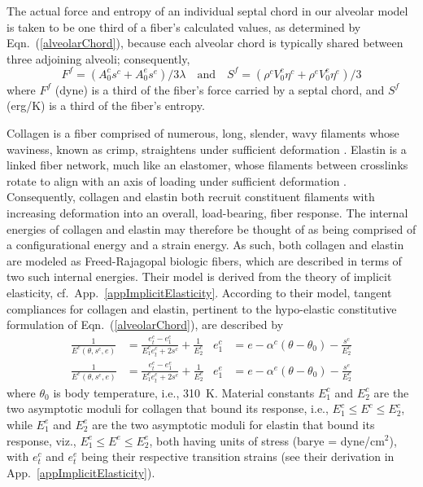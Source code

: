 The actual force and entropy of an individual septal chord in our alveolar model is taken to be one third of a fiber's calculated values, as determined by Eqn.~(\ref{alveolarChord}), because each alveolar chord is typically shared between three adjoining alveoli; consequently, 
\begin{equation}
    \label{septalChordCEs}
    F^f = ( A_0^c s^c + A_0^e s^e ) / 3 \lambda 
    \quad \text{and} \quad
    S^f = ( \rho^c V_0^c \eta^c + \rho^e V_0^e \eta^e ) / 3 
\end{equation}  
where $F^f$ (dyne) is a third of the fiber's force carried by a septal chord, and $S^f$ (erg/K) is a third of the fiber's entropy.

Collagen is a fiber comprised of numerous, long, slender, wavy filaments whose waviness, known as crimp, straightens under sufficient deformation \cite{Kastelicetal'78,FreedDoehring05}.  Elastin is a linked fiber network, much like an elastomer, whose filaments between crosslinks rotate to align with an axis of loading under sufficient deformation \cite{AaronGosline81,Urry89}.  Consequently, collagen and elastin both recruit constituent filaments with increasing deformation into an overall, load-bearing, fiber response.  The internal energies of collagen and elastin may therefore be thought of as being comprised of a configurational energy and a strain energy.  As such, both collagen and elastin are modeled as Freed-Rajagopal biologic fibers, which are described in terms of two such internal energies.  Their model is derived from the theory of implicit elasticity, cf.\ App.~\ref{appImplicitElasticity}.  According to their model, tangent compliances for collagen and elastin, pertinent to the hypo-elastic constitutive formulation of Eqn.~(\ref{alveolarChord}), are described by
\begin{subequations}
    \label{septalChordModuli}
    \begin{align}
	\frac{1}{E^c (\theta , s^c , e )} & = \frac{e_t^c - e_1^c}{E_1^c e_t^c + 2s^c} + \frac{1}{E_2^c} &
	e_1^c & = e - \alpha^c (\theta - \theta_0) - \frac{s^c}{E_2^c} \\
    \frac{1}{E^e (\theta , s^e , e )} & = \frac{e_t^e - e_1^e}{E_1^e e_t^e + 2s^e} + \frac{1}{E_2^e} &
    e_1^e & = e - \alpha^e (\theta - \theta_0) - \frac{s^e}{E_2^e} 
    \end{align}
\end{subequations}
where $\theta_0$ is body temperature, i.e., 310~K.  Material constants $E_1^c$ and $E_2^c$ are the two asymptotic moduli for collagen that bound its response, i.e., $E_1^c \leq E^c \leq E^c_2$, while $E_1^e$ and $E_2^e$ are the two asymptotic moduli for elastin that bound its response, viz., $E^e_1 \leq E^e \leq E^e_2$, both having units of stress (barye = dyne/$\text{cm}^2$), with $e_t^c$ and $e_t^e$ being their respective transition strains (see their derivation in App.~\ref{appImplicitElasticity}).  

